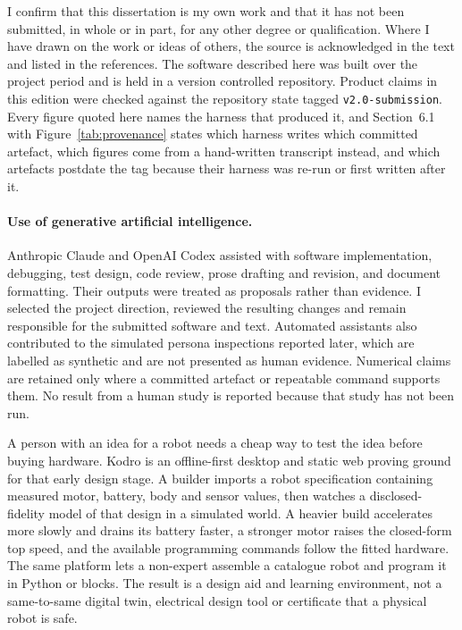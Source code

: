 \documentclass[11pt,a4paper]{report}
\begin{document}
I confirm that this dissertation is my own work and that it has not been submitted, in whole or in part, for any other degree or qualification. Where I have drawn on the work or ideas of others, the source is acknowledged in the text and listed in the references. The software described here was built over the project period and is held in a version controlled repository. Product claims in this edition were checked against the repository state tagged \texttt{v2.0-submission}. Every figure quoted here names the harness that produced it, and Section~6.1 with Figure~\ref{tab:provenance} states which harness writes which committed artefact, which figures come from a hand-written transcript instead, and which artefacts postdate the tag because their harness was re-run or first written after it.

\paragraph{Use of generative artificial intelligence.} Anthropic Claude and OpenAI Codex assisted with software implementation, debugging, test design, code review, prose drafting and revision, and document formatting. Their outputs were treated as proposals rather than evidence. I selected the project direction, reviewed the resulting changes and remain responsible for the submitted software and text. Automated assistants also contributed to the simulated persona inspections reported later, which are labelled as synthetic and are not presented as human evidence. Numerical claims are retained only where a committed artefact or repeatable command supports them. No result from a human study is reported because that study has not been run.

A person with an idea for a robot needs a cheap way to test the idea before buying hardware. Kodro is an offline-first desktop and static web proving ground for that early design stage. A builder imports a robot specification containing measured motor, battery, body and sensor values, then watches a disclosed-fidelity model of that design in a simulated world. A heavier build accelerates more slowly and drains its battery faster, a stronger motor raises the closed-form top speed, and the available programming commands follow the fitted hardware. The same platform lets a non-expert assemble a catalogue robot and program it in Python or blocks. The result is a design aid and learning environment, not a same-to-same digital twin, electrical design tool or certificate that a physical robot is safe.
\end{document}
